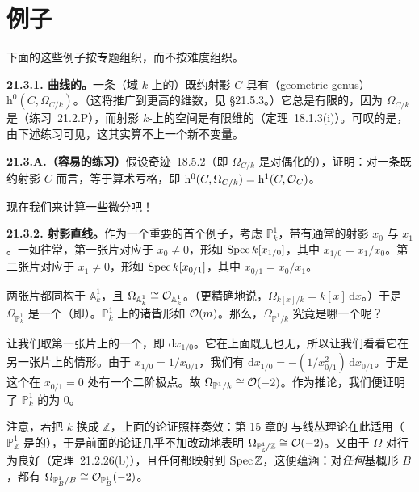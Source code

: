 
\section{例子}

下面的这些例子按专题组织，而不按难度组织。

\textbf{21.3.1. 曲线的\trGeometricGenus。}\quad 一条（域 $k$ 上的）\trSmooth{}既约射影\trCurve{} $C$ 具有\textbf{\trGeometricGenus}（geometric genus）$\mathrm{h}^0(C,\Omega_{C/k})$。（这将推广到更高的维数，见 \S21.5.3。）它总是有限的，因为 $\Omega_{C/k}$ 是\trCoherentSheaf（\mbox{练习~21.2.P}），而射影 $k$-\trScheme{}上\trCoherentSheaf{}的\trSection{}空间是有限维的（\mbox{定理~18.1.3(i)}）。可叹的是，由下述练习可见，这其实算不上一个新不变量。

\textbf{21.3.A.（容易的练习）}\quad 假设\mbox{奇迹~18.5.2}（即 $\Omega_{C/k}$ 是\trSerre{}对偶化的），证明：对一条\trSmooth{}既约射影\trCurve{} $C$ 而言，\trGeometricGenus{}等于算术亏格，即 $\mathrm{h}^0(C,\Omega_{C/k})=\mathrm{h}^1(C,\mathcal{O}_C)$。

现在我们来计算一些微分吧！

\textbf{21.3.2. 射影直线。}\quad 作为一个重要的首个例子，考虑 $\mathbb{P}^1_k$，带有通常的射影\trCoordinate{} $x_0$ 与 $x_1$。一如往常，第一张片对应于 $x_0\ne0$，形如 $\operatorname{Spec} k[x_{1/0}]$，其中 $x_{1/0}=x_1/x_0$。第二张片对应于 $x_1\ne0$，形如 $\operatorname{Spec} k[x_{0/1}]$，其中 $x_{0/1}=x_0/x_1$。

两张片都同构于 $\mathbb{A}^1_k$，且 $\Omega_{\mathbb{A}^1_k}\cong\mathcal{O}_{\mathbb{A}^1_k}$。（更精确地说，$\Omega_{k[x]/k}=k[x]\,\mathrm{d}x$。）于是 $\Omega_{\mathbb{P}^1_k}$ 是一个\trInvertibleSheaf（即\trLineBundle）。$\mathbb{P}^1_k$ 上的诸\trInvertibleSheaf{}皆形如 $\mathcal{O}(m)$。那么，$\Omega_{\mathbb{P}^1/k}$ 究竟是哪一个\trInvertibleSheaf{}呢？

让我们取第一张片上的一个\trSection，即 $\mathrm{d}x_{1/0}$。它在上面既无\trZeros{}也无\trPole，所以让我们看看它在另一张片上的情形。由于 $x_{1/0}=1/x_{0/1}$，我们有 $\mathrm{d}x_{1/0}=-(1/x_{0/1}^2)\,\mathrm{d}x_{0/1}$。于是这个\trSection{}在 $x_{0/1}=0$ 处有一个二阶极点。故 $\Omega_{\mathbb{P}^1/k}\cong\mathcal{O}(-2)$。作为推论，我们便证明了 $\mathbb{P}^1_k$ 的\trGeometricGenus{}为 $0$。

注意，若把 $k$ 换成 $\mathbb{Z}$，上面的论证照样奏效：第 15 章的 \trWeilDivisor{}与线丛理论在此适用（$\mathbb{P}^1_\mathbb{Z}$ 是\trFactorial{}的），于是前面的论证几乎不加改动地表明 $\Omega_{\mathbb{P}^1_\mathbb{Z}/\mathbb{Z}}\cong\mathcal{O}(-2)$。又由于 $\Omega$ 对\trBaseChange{}行为良好（\mbox{定理~21.2.26(b)}），且任何\trScheme{}都映射到 $\operatorname{Spec}\mathbb{Z}$，这便蕴涵：对\emph{任何}基概形 $B$，都有 $\Omega_{\mathbb{P}^1_B/B}\cong\mathcal{O}_{\mathbb{P}^1_B}(-2)$。

